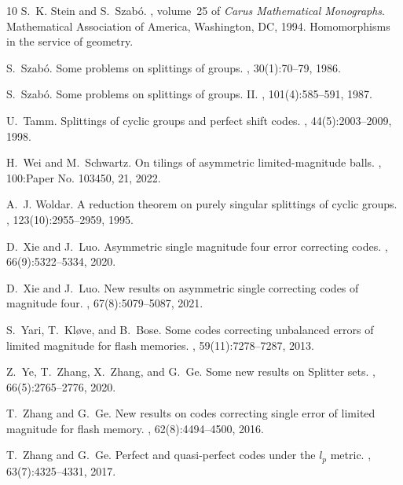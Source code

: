 \documentclass[12pt]{article}
\begin{document}
\begin{thebibliography}{10}
	S.~K. Stein and S.~Szab\'{o}.
	, volume~25 of {\em Carus Mathematical
		Monographs}.
	\newblock Mathematical Association of America, Washington, DC, 1994.
	\newblock Homomorphisms in the service of geometry.
	
	S.~Szab{\'o}.
	\newblock Some problems on splittings of groups.
	, 30(1):70--79, 1986.
	
	S.~Szab{\'o}.
	\newblock Some problems on splittings of groups. {II}.
	, 101(4):585--591, 1987.
	
	U.~Tamm.
	\newblock Splittings of cyclic groups and perfect shift codes.
	, 44(5):2003--2009, 1998.
	
	H.~Wei and M.~Schwartz.
	\newblock On tilings of asymmetric limited-magnitude balls.
	, 100:Paper No. 103450, 21, 2022.
	
	A.~J. Woldar.
	\newblock A reduction theorem on purely singular splittings of cyclic groups.
	, 123(10):2955--2959, 1995.
	
	D.~Xie and J.~Luo.
	\newblock Asymmetric single magnitude four error correcting codes.
	, 66(9):5322--5334, 2020.
	
	D.~Xie and J.~Luo.
	\newblock New results on asymmetric single correcting codes of magnitude four.
	, 67(8):5079--5087, 2021.
	
	S.~Yari, T.~Kl{\o}ve, and B.~Bose.
	\newblock Some codes correcting unbalanced errors of limited magnitude for
	flash memories.
	, 59(11):7278--7287, 2013.
	
	Z.~Ye, T.~Zhang, X.~Zhang, and G.~Ge.
	\newblock Some new results on {S}plitter sets.
	, 66(5):2765--2776, 2020.
	
	T.~Zhang and G.~Ge.
	\newblock New results on codes correcting single error of limited magnitude for
	flash memory.
	, 62(8):4494--4500, 2016.
	
	T.~Zhang and G.~Ge.
	\newblock Perfect and quasi-perfect codes under the {$l_p$} metric.
	, 63(7):4325--4331, 2017.
	

\end{thebibliography}
\end{document}
